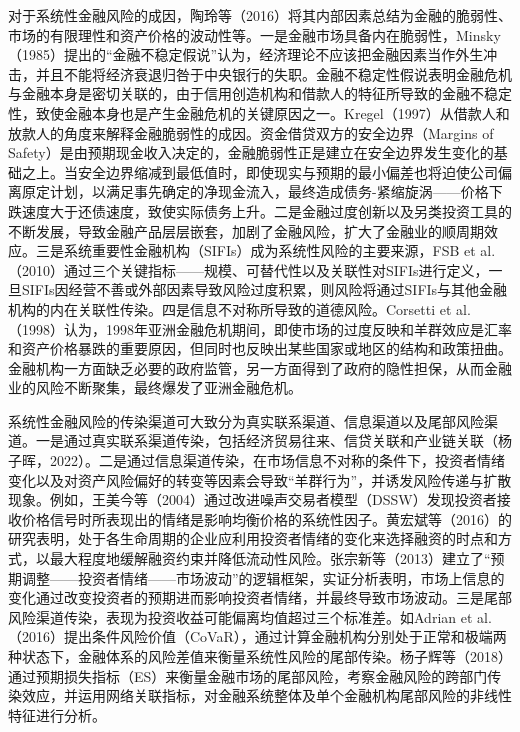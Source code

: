 \documentclass[lang=cn]{elegantpaper}
\begin{document}
对于系统性金融风险的成因，陶玲等（2016）\cite{02}将其内部因素总结为金融的脆弱性、市场的有限理性和资产价格的波动性等。一是金融市场具备内在脆弱性，Minsky（1985）\cite{03}提出的“金融不稳定假说”认为，经济理论不应该把金融因素当作外生冲击，并且不能将经济衰退归咎于中央银行的失职。金融不稳定性假说表明金融危机与金融本身是密切关联的，由于信用创造机构和借款人的特征所导致的金融不稳定性，致使金融本身也是产生金融危机的关键原因之一。Kregel（1997）\cite{04}从借款人和放款人的角度来解释金融脆弱性的成因。资金借贷双方的安全边界（Margins of Safety）是由预期现金收入决定的，金融脆弱性正是建立在安全边界发生变化的基础之上。当安全边界缩减到最低值时，即使现实与预期的最小偏差也将迫使公司偏离原定计划，以满足事先确定的净现金流入，最终造成债务-紧缩旋涡——价格下跌速度大于还债速度，致使实际债务上升。二是金融过度创新以及另类投资工具的不断发展，导致金融产品层层嵌套，加剧了金融风险，扩大了金融业的顺周期效应。三是系统重要性金融机构（SIFIs）成为系统性风险的主要来源，FSB et al.（2010）\cite{05}通过三个关键指标——规模、可替代性以及关联性对SIFIs进行定义，一旦SIFIs因经营不善或外部因素导致风险过度积累，则风险将通过SIFIs与其他金融机构的内在关联性传染。四是信息不对称所导致的道德风险。Corsetti et al.（1998）\cite{06}认为，1998年亚洲金融危机期间，即使市场的过度反映和羊群效应是汇率和资产价格暴跌的重要原因，但同时也反映出某些国家或地区的结构和政策扭曲。金融机构一方面缺乏必要的政府监管，另一方面得到了政府的隐性担保，从而金融业的风险不断聚集，最终爆发了亚洲金融危机。

系统性金融风险的传染渠道可大致分为真实联系渠道、信息渠道以及尾部风险渠道。一是通过真实联系渠道传染，包括经济贸易往来、信贷关联和产业链关联（杨子晖，2022）\cite{07}。二是通过信息渠道传染，在市场信息不对称的条件下，投资者情绪变化以及对资产风险偏好的转变等因素会导致“羊群行为”，并诱发风险传递与扩散现象。例如，王美今等（2004）\cite{08}通过改进噪声交易者模型（DSSW）发现投资者接收价格信号时所表现出的情绪是影响均衡价格的系统性因子。黄宏斌等（2016）\cite{09}的研究表明，处于各生命周期的企业应利用投资者情绪的变化来选择融资的时点和方式，以最大程度地缓解融资约束并降低流动性风险。张宗新等（2013）\cite{10}建立了“预期调整——投资者情绪——市场波动”的逻辑框架，实证分析表明，市场上信息的变化通过改变投资者的预期进而影响投资者情绪，并最终导致市场波动。三是尾部风险渠道传染，表现为投资收益可能偏离均值超过三个标准差。如Adrian et al.（2016）\cite{11}提出条件风险价值（CoVaR），通过计算金融机构分别处于正常和极端两种状态下，金融体系的风险差值来衡量系统性风险的尾部传染。杨子辉等（2018）\cite{12}通过预期损失指标（ES）来衡量金融市场的尾部风险，考察金融风险的跨部门传染效应，并运用网络关联指标，对金融系统整体及单个金融机构尾部风险的非线性特征进行分析。
\end{document}
